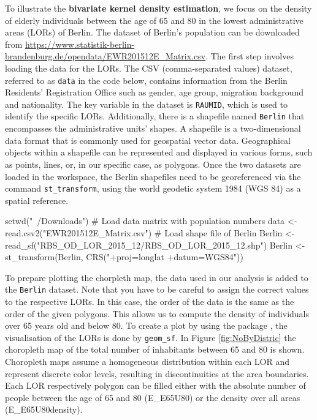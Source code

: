 To illustrate the \textbf{bivariate kernel density estimation}, we focus on the density of elderly individuals between the age of 65 and 80 in the lowest administrative areas (LORs) of Berlin. The dataset of Berlin's population can be downloaded from \url{https://www.statistik-berlin-brandenburg.de/opendata/EWR201512E_Matrix.csv}. The first step involves loading the data for the LORs. The CSV (comma-separated values) dataset, referred to as \texttt{data} in the code below, contains information from the Berlin Residents' Registration Office such as gender, age group, migration background and nationality. 
The key variable in the dataset is \texttt{RAUMID}, which is used to identify the specific LORs. 
Additionally, there is a shapefile named \texttt{Berlin} that encompasses the administrative units' shapes. A shapefile is  a two-dimensional data format that is commonly used for geospatial vector data. Geographical objects within a shapefile can be represented and displayed in various forms, such as points, lines, or, in our specific case, as polygons. Once the two datasets are loaded in the  workspace, the Berlin shapefiles need to be georeferenced via the command \texttt{st\_transform}, using the world geodetic system 1984 (WGS 84) as a spatial reference. 


\begin{example} 
    setwd("~/Downloads") 
    # Load data matrix with population numbers 
    data <- read.csv2("EWR201512E_Matrix.csv")
    # Load shape file of Berlin
    Berlin <- read_sf("RBS_OD_LOR_2015_12/RBS_OD_LOR_2015_12.shp")
    Berlin <- st_transform(Berlin, CRS("+proj=longlat +datum=WGS84"))
\end{example}

To prepare plotting the chorpleth map, the data used in our analysis is added to the \texttt{Berlin} dataset. Note that you have to be careful to assign the correct values to the respective LORs. In this case, the order of the data is the same as the order of the given polygons.
This allows us to compute the density of individuals over 65 years old and below 80. 
To create a plot by using the package \hyperlink{https://cran.r-project.org/web/packages/ggplot2/index.html}{}, the visualisation of the LORs is done by \texttt{geom\_sf}.
In Figure \ref{fig:NoByDistric} the choropleth map of the total number of inhabitants between 65 and 80 is shown. Choropleth maps assume a homogeneous distribution within each LOR and represent discrete color levels, resulting in discontinuities at the area boundaries.
Each LOR respectively polygon can be filled either with the absolute number of people between the age of 65 and 80 (E\_E65U80) or the density over all areas (E\_E65U80density). 

